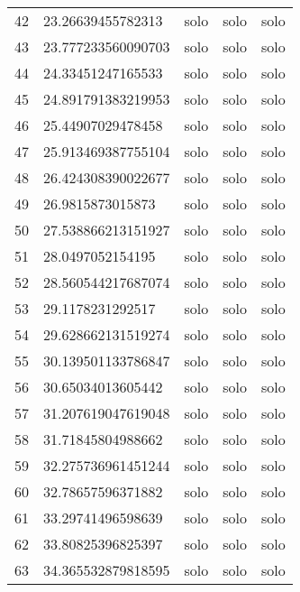 \begin{table}[]
\begin{tabular}{lllll}
    42   & 23.26639455782313  & solo         & solo            & solo           \\
    43   & 23.777233560090703 & solo         & solo            & solo           \\
    44   & 24.33451247165533  & solo         & solo            & solo           \\
    45   & 24.891791383219953 & solo         & solo            & solo           \\
    46   & 25.44907029478458  & solo         & solo            & solo           \\
    47   & 25.913469387755104 & solo         & solo            & solo           \\
    48   & 26.424308390022677 & solo         & solo            & solo           \\
    49   & 26.9815873015873   & solo         & solo            & solo           \\
    50   & 27.538866213151927 & solo         & solo            & solo           \\
    51   & 28.0497052154195   & solo         & solo            & solo           \\
    52   & 28.560544217687074 & solo         & solo            & solo           \\
    53   & 29.1178231292517   & solo         & solo            & solo           \\
    54   & 29.628662131519274 & solo         & solo            & solo           \\
    55   & 30.139501133786847 & solo         & solo            & solo           \\
    56   & 30.65034013605442  & solo         & solo            & solo           \\
    57   & 31.207619047619048 & solo         & solo            & solo           \\
    58   & 31.71845804988662  & solo         & solo            & solo           \\
    59   & 32.275736961451244 & solo         & solo            & solo           \\
    60   & 32.78657596371882  & solo         & solo            & solo           \\
    61   & 33.29741496598639  & solo         & solo            & solo           \\
    62   & 33.80825396825397  & solo         & solo            & solo           \\
    63   & 34.365532879818595 & solo         & solo            & solo           \\

\end{tabular}
\end{table}
